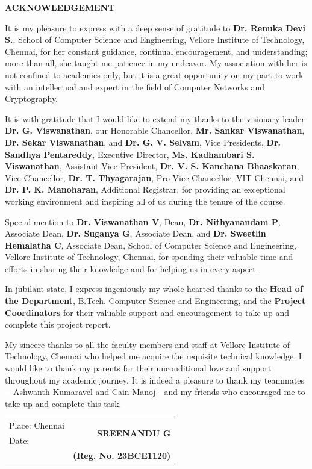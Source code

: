 \thispagestyle{plain}
\begin{center}
    {\fontsize{14}{18}\selectfont\textbf{ACKNOWLEDGEMENT}}\\[0.8cm]
\end{center}

{\fontsize{12}{18}\selectfont
It is my pleasure to express with a deep sense of gratitude to \textbf{Dr. Renuka Devi S.}, School of Computer Science and Engineering, Vellore Institute of Technology, Chennai, for her constant guidance, continual encouragement, and understanding; more than all, she taught me patience in my endeavor. My association with her is not confined to academics only, but it is a great opportunity on my part to work with an intellectual and expert in the field of Computer Networks and Cryptography.

It is with gratitude that I would like to extend my thanks to the visionary leader \textbf{Dr. G. Viswanathan}, our Honorable Chancellor, \textbf{Mr. Sankar Viswanathan}, \textbf{Dr. Sekar Viswanathan}, and \textbf{Dr. G. V. Selvam}, Vice Presidents, \textbf{Dr. Sandhya Pentareddy}, Executive Director, \textbf{Ms. Kadhambari S. Viswanathan}, Assistant Vice-President, \textbf{Dr. V. S. Kanchana Bhaaskaran}, Vice-Chancellor, \textbf{Dr. T. Thyagarajan}, Pro-Vice Chancellor, VIT Chennai, and \textbf{Dr. P. K. Manoharan}, Additional Registrar, for providing an exceptional working environment and inspiring all of us during the tenure of the course.

Special mention to \textbf{Dr. Viswanathan V}, Dean, \textbf{Dr. Nithyanandam P}, Associate Dean, \textbf{Dr. Suganya G}, Associate Dean, and \textbf{Dr. Sweetlin Hemalatha C}, Associate Dean, School of Computer Science and Engineering, Vellore Institute of Technology, Chennai, for spending their valuable time and efforts in sharing their knowledge and for helping us in every aspect.

In jubilant state, I express ingeniously my whole-hearted thanks to the \textbf{Head of the Department}, B.Tech. Computer Science and Engineering, and the \textbf{Project Coordinators} for their valuable support and encouragement to take up and complete this project report.

My sincere thanks to all the faculty members and staff at Vellore Institute of Technology, Chennai who helped me acquire the requisite technical knowledge. I would like to thank my parents for their unconditional love and support throughout my academic journey. It is indeed a pleasure to thank my teammates—Ashwanth Kumaravel and Cain Manoj—and my friends who encouraged me to take up and complete this task.
}

\vspace{2.5cm}

\noindent
\begin{tabular*}{\textwidth}{@{\extracolsep{\fill}}lr}
    Place: Chennai & \multirow{2}{*}{\textbf{SREENANDU G}} \\
    Date: & \\
    & \textbf{(Reg. No. 23BCE1120)}
\end{tabular*}
